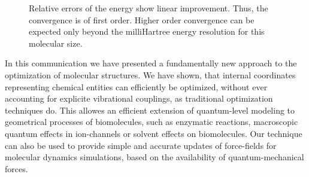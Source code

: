 \documentclass[prl,aps,twocolumn,showpacs,twocolumngrid,superbib]{revtex4}
\begin{document}
%
%
\begin{figure}[h]
\caption{
\small  
Relative errors of the energy show linear improvement.
Thus, the convergence is of first order. Higher order
convergence can be expected only beyond the milliHartree
energy resolution for this molecular size.
\label{order-of-conv}
}
\end{figure}
In this communication we have presented a fundamentally new approach
to the optimization of molecular structures.
We have shown, that internal coordinates representing chemical 
entities can efficiently be optimized, without
ever accounting for explicite vibrational couplings, as traditional
optimization techniques do. This allowes an efficient
extension of quantum-level modeling to geometrical processes
of biomolecules, such as enzymatic reactions, macroscopic quantum 
effects in ion-channels or solvent effects on biomolecules.
Our technique can also be used
to provide simple and accurate updates of force-fields
for molecular dynamics simulations, based on the availability of
quantum-mechanical forces.
%
%

\end{document}
